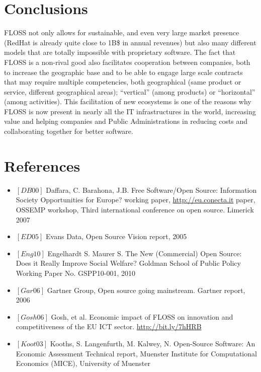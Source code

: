 \section*{Conclusions}

FLOSS not only allows for sustainable, and even very large market presence
(RedHat is already quite close to 1B\$ in annual revenues) but also many
different models that are totally impossible with proprietary software. The fact
that FLOSS is a non-rival good also facilitates cooperation between
companies, both to increase the geographic base and to be able to engage large
scale contracts that may require multiple competencies, both geographical (same
product or service, different geographical areas); ``vertical'' (among products)
or ``horizontal'' (among activities). This facilitation of new ecosystems is one
of the reasons why FLOSS is now present in nearly all
the IT infrastructures in the world, increasing value and helping companies and
Public Administrations in reducing costs and collaborating together for better
software.

\section*{References}

\begin{itemize}
 \item $[DB 00]$ Daffara, C. Barahona, J.B. Free Software/Open Source: Information
Society Opportunities for Europe? working paper, \url{http://eu.conecta.it}
paper, OSSEMP workshop, Third international conference on open source. Limerick 2007
 \item $[ED 05]$ Evans Data, Open Source Vision report, 2005 
 \item $[Eng 10]$ Engelhardt S. Maurer S. The New (Commercial) Open Source: Does it
Really Improve Social Welfare? Goldman School of Public Policy Working Paper
No. GSPP10-001, 2010
 \item $[Gar 06]$ Gartner Group, Open source going mainstream. Gartner report, 2006
 \item $[Gosh 06]$ Gosh, et al. Economic impact of FLOSS on innovation and
competitiveness of the EU ICT sector.
\url{http://bit.ly/7hHRB}
 \item $[Koot 03]$ Kooths, S. Langenfurth, M. Kalwey, N. Open-Source Software:
An Economic Assessment Technical report, Muenster Institute for Computational Economics
(MICE), University of Muenster
\end{itemize}
